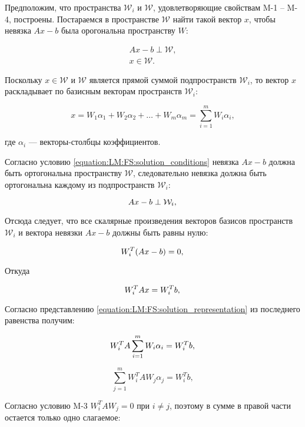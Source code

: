 Предположим, что пространства $\mathcal W_i$ и $\mathcal W$, удовлетворяющие свойствам M-1 -- M-4, построены. Постараемся в
пространстве $\mathcal W$ найти такой вектор $x$, чтобы невязка $Ax - b$ была орогональна пространству $W$:

\begin{equation} \label{equation:LM:FS:solution_conditions}
	\begin{array}{c}
	Ax - b \perp \mathcal W, \\
	x \in \mathcal W.
	\end{array}
\end{equation}

Поскольку $x \in \mathcal W$ и $\mathcal W$ является прямой суммой подпространств $\mathcal W_i$, то вектор $x$ раскладывает
по базисным векторам пространств $\mathcal W_i$:

\begin{equation} \label{equation:LM:FS:solution_representation}
	x = W_1 \alpha_1 + W_2 \alpha_2 + \dots + W_m \alpha_m = \sum_{i=1}^m W_i \alpha_i,
\end{equation}

где $\alpha_i$ --- векторы-столбцы коэффициентов.

Согласно условию \ref{equation:LM:FS:solution_conditions} невязка $Ax - b$ должна быть ортогональна пространству $\mathcal W$, следовательно
невязка должна быть ортогональна каждому из подпространств $\mathcal W_i$:

$$
	Ax - b \perp \mathcal W_i, \\
$$

Отсюда следует, что все скалярные произведения векторов базисов пространств $\mathcal W_i$ и вектора невязки $Ax-b$ должны быть равны нулю:

$$
	W_i^T ( Ax - b ) = 0, \\
$$

Откуда

$$
	W_i^T Ax = W_i^T b, \\
$$

Согласно представлению \ref{equation:LM:FS:solution_representation} из последнего равенства получим:

$$
	W_i^T A \sum_{i=1}^m W_i \alpha_i = W_i^T b, \\
$$

$$
	\sum_{j=1}^m W_i^T A W_j \alpha_j = W_i^T b,
$$

Согласно условию M-3 $W_i^T A W_j = 0$ при $i \neq j$, поэтому в сумме в правой части остается только одно слагаемое:


